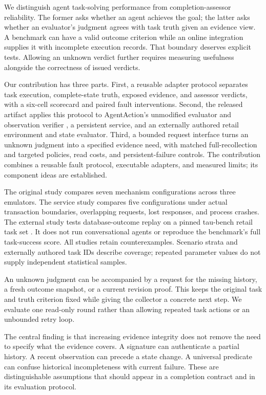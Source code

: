\documentclass[11pt]{article}
\begin{document}
We distinguish agent task-solving performance from completion-assessor reliability. The former asks whether an agent achieves the goal; the latter asks whether an evaluator's judgment agrees with task truth given an evidence view. A benchmark can have a valid outcome criterion while an online integration supplies it with incomplete execution records. That boundary deserves explicit tests. Allowing an unknown verdict further requires measuring usefulness alongside the correctness of issued verdicts.

Our contribution has three parts. First, a reusable adapter protocol separates task execution, complete-state truth, exposed evidence, and assessor verdicts, with a six-cell scorecard and paired fault interventions. Second, the released artifact applies this protocol to AgentAction's unmodified evaluator and observation verifier \cite{agentaction}, a persistent service, and an externally authored retail environment and state evaluator. Third, a bounded request interface turns an unknown judgment into a specified evidence need, with matched full-recollection and targeted policies, read costs, and persistent-failure controls. The contribution combines a reusable fault protocol, executable adapters, and measured limits; its component ideas are established.

The original study compares seven mechanism configurations across three emulators. The service study compares five configurations under actual transaction boundaries, overlapping requests, lost responses, and process crashes. The external study tests database-outcome replay on a pinned tau-bench retail task set \cite{taurepo}. It does not run conversational agents or reproduce the benchmark's full task-success score. All studies retain counterexamples. Scenario strata and externally authored task IDs describe coverage; repeated parameter values do not supply independent statistical samples.

An unknown judgment can be accompanied by a request for the missing history, a fresh outcome snapshot, or a current revision proof. This keeps the original task and truth criterion fixed while giving the collector a concrete next step. We evaluate one read-only round rather than allowing repeated task actions or an unbounded retry loop.

The central finding is that increasing evidence integrity does not remove the need to specify what the evidence covers. A signature can authenticate a partial history. A recent observation can precede a state change. A universal predicate can confuse historical incompleteness with current failure. These are distinguishable assumptions that should appear in a completion contract and in its evaluation protocol.
\end{document}
